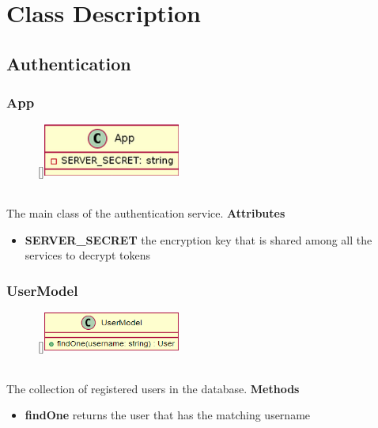 \section{Class Description}

\subsection{Authentication}
\subsubsection{App}
\label{App}
\begin{figure}
    \raisebox{0pt}[\dimexpr{}\baselineskip\relax]{\includegraphics[width=4.5cm]{classes/auth/app.png}}
\end{figure}
~\\
The main class of the authentication service.
\newline
\newline
\newline
\newline
\textbf{Attributes}
\begin{itemize}
    \item \textbf{SERVER\_SECRET} the encryption key that is shared among all the services to decrypt tokens
\end{itemize}

\subsubsection{UserModel}
\label{UserModel}
\begin{figure}
    \raisebox{0pt}[\dimexpr{}\baselineskip\relax]{\includegraphics[width=4.5cm]{classes/auth/1.png}}
\end{figure} 
~\\
The collection of registered users in the database.
\newline
\newline
\newline
\newline
\textbf{Methods}
\begin{itemize}
    \item \textbf{findOne} returns the user that has the matching username
\end{itemize}
\newpage
